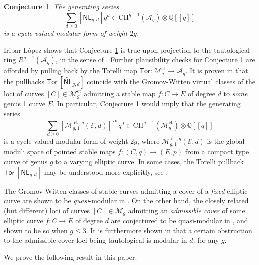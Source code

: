\documentclass[12pt]{amsart}
\def\cA{\mathcal{A}}
\def\cE{\mathcal{E}}
\def\cM{\mathcal{M}}
\def\bQ{\mathbb{Q}}
\def\barM{\overline{\cM}}
\DeclareMathOperator{\ct}{ct}
\DeclareMathOperator{\vir}{vir}
\newcommand{\CH}{\mathrm{CH}}
\newcommand{\wNL}{{\widetilde{\mathsf{NL}}}}
\newcommand{\Tor}{{\mathsf{Tor}}}
\newtheorem{conj}{Conjecture}
\theoremstyle{definition}
\begin{document}
\begin{conj}\label{conj_ag}
    The generating series
    \begin{equation*}
        \sum_{d\ge 0}[\wNL_{g,d}]q^d \in  \CH^{g-1}(\cA_g)\otimes \bQ[[q]]
    \end{equation*}
    is a cycle-valued modular form of weight $2g$.
\end{conj}

Iribar L\'{o}pez \cite[Corollary 4]{il} shows that Conjecture \ref{conj_ag} is true upon projection to the tautological ring $R^{g-1}(\cA_g)$, in the sense of \cite{cmop}. Further plausibility checks for Conjecture \ref{conj_ag} are afforded by pulling back by the Torelli map $\Tor:\cM_g^{\ct}\to\cA_g$. It is proven in \cite{gl} that the pullbacks $\Tor^{!}[\wNL_{g,d}]$ coincide with the Gromov-Witten virtual classes of the loci of curves $[C]\in \cM_g^{\ct}$ admitting a stable map $f:C\to E$ of degree $d$ to \emph{some} genus 1 curve $E$. In particular, Conjecture \ref{conj_ag} would imply that the generating series
    \begin{equation*}
        \sum_{d\ge 0}[\cM^{\ct,q}_{g,1}(\cE,d)]^{\vir} q^d \in  \CH^{g-1}(\cM_g^{\ct})\otimes \bQ[[q]]
    \end{equation*}
    is a cycle-valued modular form of weight $2g$, where $\cM^{\ct,q}_{g,1}(\cE,d)$ is the global moduli space of pointed stable maps $f:(C,q)\to (E,p)$ from a compact type curve of genus $g$ to a varying elliptic curve. In some cases, the Torelli pullback $\Tor^{!}[\wNL_{g,d}]$ may be understood more explicitly, see \cite{cop}.

The Gromov-Witten classes of stable curves admitting a cover of a \emph{fixed} elliptic curve are shown to be {\it quasi}-modular in \cite{obpix}. On the other hand, the closely related (but different) loci of curves $[C]\in \barM_g$ admitting an \emph{admissible cover} of some elliptic curve $f:C\to E$ of degree $d$ are conjectured to be quasi-modular in \cite{lian_d-ell}, and shown to be so when $g\le 3$. It is furthermore shown in \cite{lian_nontaut} that a certain obstruction to the admissible cover loci being tautological is modular in $d$, for any $g$.

We prove the following result in this paper.
\end{document}

